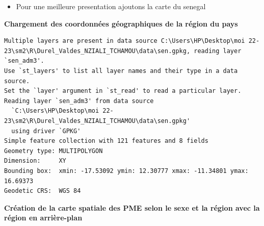 \documentclass[
  letterpaper,
  DIV=11,
  numbers=noendperiod]{scrartcl}
\providecommand{\tightlist}{%
  \setlength{\itemsep}{0pt}\setlength{\parskip}{0pt}}\usepackage{longtable,booktabs,array}
\begin{document}
\begin{itemize}
\tightlist
\item
  Pour une meilleure presentation ajoutons la carte du senegal
\end{itemize}

\textbf{Chargement des coordonnées géographiques de la région du pays}

\begin{verbatim}
Multiple layers are present in data source C:\Users\HP\Desktop\moi 22-23\sm2\R\Durel_Valdes_NZIALI_TCHAMOU\data\sen.gpkg, reading layer `sen_adm3'.
Use `st_layers' to list all layer names and their type in a data source.
Set the `layer' argument in `st_read' to read a particular layer.
Reading layer `sen_adm3' from data source 
  `C:\Users\HP\Desktop\moi 22-23\sm2\R\Durel_Valdes_NZIALI_TCHAMOU\data\sen.gpkg' 
  using driver `GPKG'
Simple feature collection with 121 features and 8 fields
Geometry type: MULTIPOLYGON
Dimension:     XY
Bounding box:  xmin: -17.53092 ymin: 12.30777 xmax: -11.34801 ymax: 16.69373
Geodetic CRS:  WGS 84
\end{verbatim}

\textbf{Création de la carte spatiale des PME selon le sexe et la région
avec la région en arrière-plan}
\end{document}
